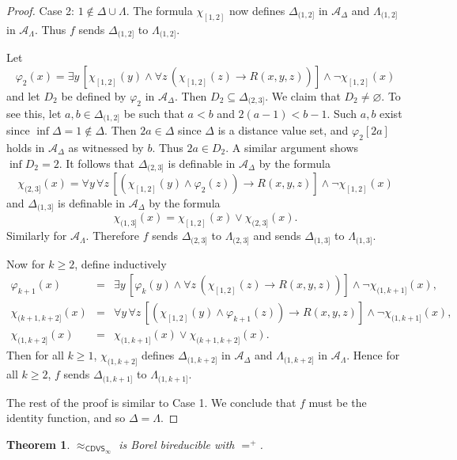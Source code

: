 \documentclass{amsart}
\newtheorem{theorem}{Theorem}[section]
\theoremstyle{definition}
\theoremstyle{remark}
\begin{document}
\begin{proof}
{\sc Case 2}: $1\not\in \Delta\cup\Lambda$. The formula $\chi_{[1,2]}$ now defines $\Delta_{(1,2]}$ in $\mathcal{A}_\Delta$ and $\Lambda_{(1,2]}$ in $\mathcal{A}_\Lambda$. Thus $f$ sends $\Delta_{(1,2]}$ to $\Lambda_{(1,2]}$. 

Let
$$ \varphi_2(x)=\exists y\, [\chi_{[1,2]}(y)\wedge\forall z\,(\chi_{[1,2]}(z)\rightarrow R(x,y,z))]\wedge \neg \chi_{[1,2]}(x) $$
and let $D_2$ be defined by $\varphi_2$ in $\mathcal{A}_\Delta$. Then $D_2\subseteq\Delta_{(2,3]}$. We claim that $D_2\neq \varnothing$.  To see this, let $a, b\in \Delta_{(1,2]}$ be such that $a<b$ and $2(a-1)<b-1$. Such $a, b$ exist since $\inf\Delta=1\not\in \Delta$.  Then $2a\in\Delta$ since $\Delta$ is a distance value set, and $\varphi_2[2a]$ holds in $\mathcal{A}_\Delta$ as witnessed by $b$. Thus $2a\in D_2$. A similar argument shows $\inf D_2=2$. It follows that $\Delta_{(2,3]}$ is definable in $\mathcal{A}_\Delta$ by the formula
$$ \chi_{(2,3]}(x)=\forall y\, \forall z\, [(\chi_{[1,2]}(y)\wedge \varphi_2(z))\rightarrow R(x,y,z)]\wedge \neg\chi_{[1,2]}(x) $$
and $\Delta_{(1,3]}$ is definable in $\mathcal{A}_\Delta$ by the formula
$$ \chi_{(1,3]}(x)=\chi_{[1,2]}(x)\vee \chi_{(2,3]}(x). $$
Similarly for $\mathcal{A}_\Lambda$. Therefore $f$ sends $\Delta_{(2,3]}$ to $\Lambda_{(2,3]}$ and sends $\Delta_{(1,3]}$ to $\Lambda_{(1,3]}$.

Now for $k\geq 2$, define inductively
$$\begin{array}{rcl} \varphi_{k+1}(x)&=&\exists y\, [\varphi_k(y) \wedge \forall z\, (\chi_{[1,2]}(z)\rightarrow R(x,y,z))]\wedge \neg\chi_{(1,k+1]}(x), \\
\chi_{(k+1,k+2]}(x)&=&\forall y\, \forall z\, [(\chi_{[1,2]}(y)\wedge \varphi_{k+1}(z))\rightarrow R(x,y,z)]\wedge \neg\chi_{(1,k+1]}(x), \\
\chi_{(1,k+2]}(x)&=& \chi_{(1,k+1]}(x)\vee \chi_{(k+1,k+2]}(x). 
\end{array} $$ 
Then for all $k\geq 1$, $\chi_{(1,k+2]}$ defines $\Delta_{(1,k+2]}$ in $\mathcal{A}_\Delta$ and $\Lambda_{(1,k+2]}$ in $\mathcal{A}_\Lambda$. Hence for all $k\geq 2$, $f$ sends $\Delta_{(1,k+1]}$ to $\Lambda_{(1,k+1]}$. 

The rest of the proof is similar to Case 1. We conclude that $f$ must be the identity function, and so $\Delta=\Lambda$.
\end{proof}



\begin{theorem} $\approx_{\mathsf{CDVS}_\infty}$ is Borel bireducible with $=^+$.
\end{theorem}
\end{document}
